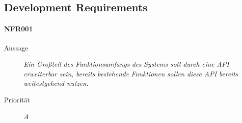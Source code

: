 \subsection{Development Requirements}


\paragraph{NFR001}
\begin{description}
  \item[Aussage] \textit{Ein Gro{\ss}teil des Funktionsumfangs des Systems soll durch eine API erweiterbar sein, bereits bestehende Funktionen sollen diese API bereits weitestgehend nutzen.}
  \item[Priorit\"at] \textit{A}
\end{description}